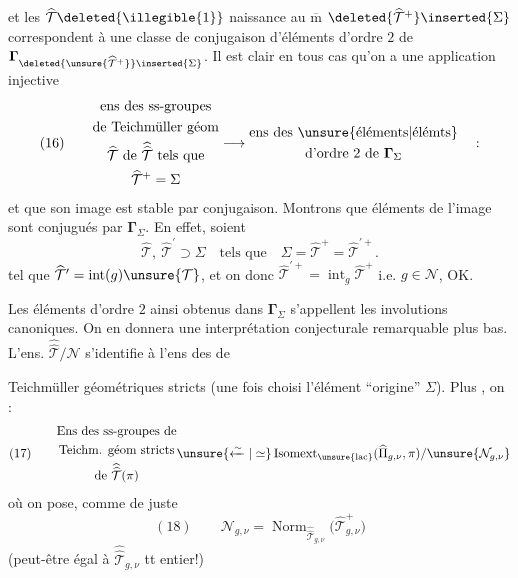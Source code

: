 

et les $\widehat{\mathcal{T}}\deleted{\illegible{1}}$  naissance au $\overline{\mathrm m}$ $\deleted{\widehat{\mathcal{T}}^{+}}\inserted{\Sigma}$ correspondent  à une classe de conjugaison d'éléments d'ordre $2$ de $\boldsymbol{\Gamma}_{\deleted{\unsure{\widehat{\mathcal{T}}^{+}}}\inserted{\Sigma}}$. Il est clair  en tous cas qu'on a une application injective
\[
(16)\qquad
\begin{gathered}
\text{ens des ss-groupes}\\
\text{de Teichmüller géom}\\
\widehat{\mathcal{T}}\text{ de }\widehat{\widehat{\mathcal{T}}}\text{ tels que}\\
\widehat{\mathcal{T}}^{+}=\Sigma
\end{gathered}
\longrightarrow
\begin{gathered}
\text{ens des }\unsure{\text{éléments}|\text{élémts}}\\
\text{d'ordre }2\text{ de }\boldsymbol{\Gamma}_{\Sigma}
\end{gathered}
\quad :
\]
et que son image est stable par conjugaison. Montrons que  éléments de l'image sont conjugués par $\boldsymbol{\Gamma}_{\Sigma}$. En effet, soient
\[
\widehat{\mathcal{T}},\ \widehat{\mathcal{T}}^{\prime}\supset\Sigma
\quad\text{tels que}\quad
\Sigma=\widehat{\mathcal{T}}^{+}=\widehat{\mathcal{T}}^{\prime+}.
\]
tel que
$\widehat{\mathcal{T}}^{\prime}=\operatorname{int}(g)\unsure{\mathcal{T}}$,
et on  donc
$\widehat{\mathcal{T}}^{\prime+}=\operatorname{int}_{g}\widehat{\mathcal{T}}^{+}$
i.e. $g\in\mathcal{N}$, OK.

Les éléments d'ordre $2$ ainsi obtenus dans $\boldsymbol{\Gamma}_{\Sigma}$ s'appellent les involutions canoniques. On en donnera une interprétation conjecturale remarquable plus bas. L'ens. $\widehat{\widehat{\mathcal{T}}}/\mathcal{N}$ s'identifie à l'ens des  de



Teichmüller géométriques stricts (une fois choisi l'élément ``origine'' $\Sigma$). Plus , on :
\[
(17)\qquad
\begin{gathered}
\text{Ens des ss-groupes de}\\
\text{Teichm. géom stricts}\\
\text{de }\widehat{\widehat{\mathcal{T}}}(\pi)
\end{gathered}
\unsure{\xleftarrow{\sim}|\simeq}
\operatorname{Isomext}_{\unsure{\mathrm{lac}}}
(\widehat{\Pi}_{g,\nu},\pi)/\unsure{\mathcal{N}_{g,\nu}}
\]
où on pose, comme de juste
\[
(18)\qquad
\mathcal{N}_{g,\nu}
=\operatorname{Norm}_{\widehat{\widehat{\mathcal{T}}}_{g,\nu}}
\bigl(\widehat{\mathcal{T}}_{g,\nu}^{+}\bigr)
\]
(peut-être égal à $\widehat{\widehat{\mathcal{T}}}_{g,\nu}$ tt entier!)

